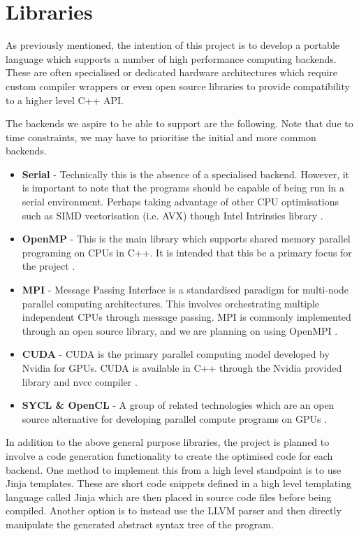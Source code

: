 \section{Libraries}

As previously mentioned, the intention of this project is to develop a portable language which supports a number of high performance computing backends. These are often specialised or dedicated hardware architectures which require custom compiler wrappers or even open source libraries to provide compatibility to a higher level C++ API. 

The backends we aspire to be able to support are the following. Note that due to time constraints, we may have to prioritise the initial and more common backends.  
\begin{itemize}
    \item \textbf{Serial} - Technically this is the absence of a specialised backend. However, it is important to note that the programs should be capable of being run in a serial environment. Perhaps taking advantage of other CPU optimisations such as SIMD vectorisation (i.e. AVX) though Intel Intrinsics library \cite{intrinsics}.
    \item \textbf{OpenMP} - This is the main library which supports shared memory parallel programing on CPUs in C++. It is intended that this be a primary focus for the project \cite{openmp}.
    \item \textbf{MPI} - Message Passing Interface is a standardised paradigm for multi-node parallel computing architectures. This involves orchestrating multiple independent CPUs through message passing. MPI is commonly implemented through an open source library, and we are planning on using OpenMPI \cite{openmpi}.
    \item \textbf{CUDA} - CUDA is the primary parallel computing model developed by Nvidia for GPUs. CUDA is available in C++ through the Nvidia provided library and nvcc compiler \cite{nvcc}.
    \item \textbf{SYCL \& OpenCL} - A group of related technologies which are an open source alternative for developing parallel compute programs on GPUs \cite{sycl}. 
    
\end{itemize}

In addition to the above general purpose libraries, the project is planned to involve a code generation functionality to create the optimised code for each backend. One method to implement this from a high level standpoint is to use Jinja \cite{jinja} templates. These are short code snippets defined in a high level templating language called Jinja which are then placed in source code files before being compiled. Another option is to instead use the LLVM \cite{llvm} parser and then directly manipulate the generated abstract syntax tree of the program. 


